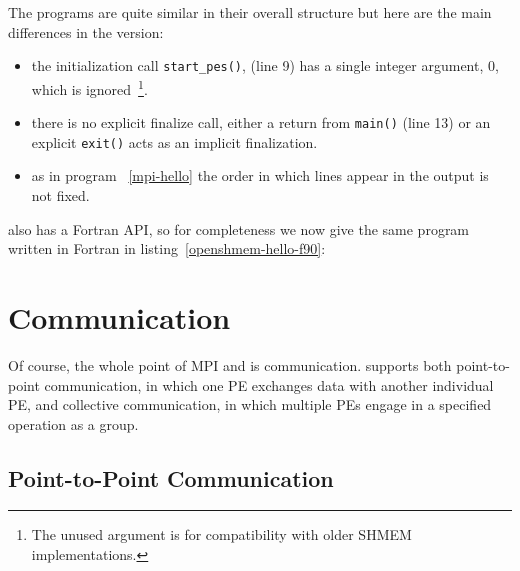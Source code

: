 \begin{minipage}{\linewidth}
\vspace{0.1in}
\vspace{0.1in}
\end{minipage}

The programs are quite similar in their overall structure but here are
the main differences in the \openshmem version:

\begin{itemize}
\item the initialization call \texttt{start\_pes()}, (line 9) has a
  single integer argument, 0, which is ignored~\footnote{The unused
    argument is for compatibility with older SHMEM implementations.}.
\item there is no explicit finalize call, either a return from
  \texttt{main()} (line 13) or an explicit \texttt{exit()} acts as an
  implicit \openshmem finalization.
\item as in program ~\ref{mpi-hello} the order in which lines appear
  in the output is not fixed.
\end{itemize}

\openshmem also has a Fortran API, so for completeness we now give the
same program written in Fortran in listing~\ref{openshmem-hello-f90}:

\begin{minipage}{\linewidth}
\vspace{0.1in}
\vspace{0.1in}
\end{minipage}

\section{Communication}

Of course, the whole point of MPI and \openshmem is communication.
\openshmem supports both point-to-point communication, in which one PE
exchanges data with another individual PE, and collective
communication, in which multiple PEs engage in a specified operation
as a group.

\subsection{Point-to-Point Communication}
\label{sec:p-to-p}

